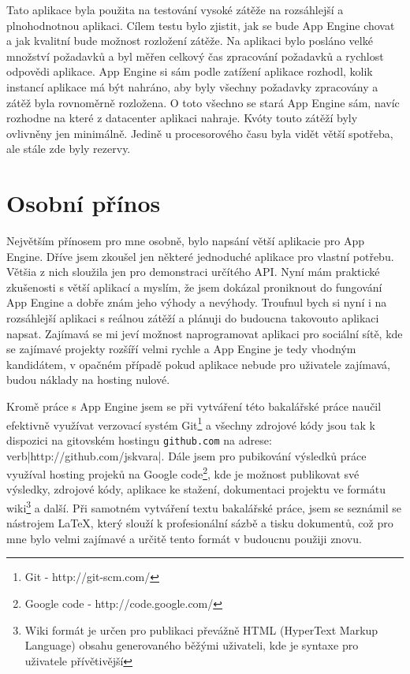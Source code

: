 Tato aplikace byla použita na testování vysoké zátěže na rozsáhlejší a plnohodnotnou aplikaci. Cílem testu bylo zjistit, jak se bude App Engine chovat a jak kvalitní bude možnost rozložení zátěže. Na aplikaci bylo posláno velké množství požadavků a byl měřen celkový čas zpracování požadavků a rychlost odpovědi aplikace.
App Engine si sám podle zatížení aplikace rozhodl, kolik instancí aplikace má být nahráno, aby byly všechny požadavky zpracovány a zátěž byla rovnoměrně rozložena. O toto všechno se stará App Engine sám, navíc rozhodne na které z datacenter aplikaci nahraje. Kvóty touto zátěží byly ovlivněny jen minimálně. Jedině u procesorového času byla vidět větší spotřeba, ale stále zde byly rezervy. 

\section{Osobní přínos}
Největším přínosem pro mne osobně, bylo napsání větší aplikacie pro App Engine. Dříve jsem zkoušel jen některé jednoduché aplikace pro vlastní potřebu. Většia z nich sloužila jen pro demonstraci určítého API. Nyní mám praktické zkušenosti s větší aplikací a myslím, že jsem dokázal proniknout do fungování App Engine a dobře znám jeho výhody a nevýhody. Troufnul bych si nyní i na rozsáhlejší aplikaci s reálnou zátěží a plánuji do budoucna takovouto aplikaci napsat. Zajímavá se mi jeví možnost naprogramovat aplikaci pro sociální sítě, kde se zajímavé projekty rozšíří velmi rychle a App Engine je tedy vhodným kandidátem, v opačném případě pokud aplikace nebude pro uživatele zajímavá, budou náklady na hosting nulové.

Kromě práce s App Engine jsem se při vytváření této bakalářské práce naučil efektivně využívat verzovací systém Git\footnote{Git - http://git-scm.com/} a všechny zdrojové kódy jsou tak k dispozici na gitovském hostingu \verb|github.com| na adrese: verb|http://github.com/jskvara|. Dále jsem pro pubikování výsledků práce využíval hosting projeků na Google code\footnote{Google code - http://code.google.com/}, kde je možnost publikovat své výsledky, zdrojové kódy, aplikace ke stažení, dokumentaci projektu ve formátu wiki\footnote{Wiki formát je určen pro publikaci převážně HTML (HyperText Markup Language) obsahu generovaného běžými uživateli, kde je syntaxe pro uživatele přívětivější} a další. Při samotném vytváření textu bakalářské práce, jsem se seznámil se nástrojem LaTeX, který slouží k profesionální sázbě a tisku dokumentů, což pro mne bylo velmi zajímavé a určitě tento formát v budoucnu použiji znovu.